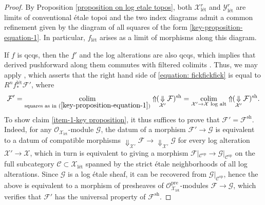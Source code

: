 \documentclass[11pt]{amsart}
\theoremstyle{definition}
\theoremstyle{definition}
\DeclareMathOperator{\arrowdown}{\!\Downarrow\!}
\newcommand{\cC}{\mathcal{C}}
\newcommand{\cF}{\mathcal{F}}
\newcommand{\cG}{\mathcal{G}}
\newcommand{\cX}{\mathcal{X}}
\newcommand{\cY}{\mathcal{Y}}
\newcommand{\LogO}[1]{\mathcal{O}_{{#1}_\text{l\'et}}}
\newcommand{\ul}[1]{\underline{#1}}
\newcommand{\cal}{\mathcal}
\def\cC{{\cal C}}
\def\cF{{\cal F}}
\def\cX{{\cal X}}
\def\cY{{\cal Y}}
\begin{document}
\begin{proof} 
By Proposition \ref{proposition on log etale topos}, both $\cX_{\text{l\'et}}^{r}$ and $\cY_{\text{l\'et}}^{r}$ are limits of conventional \'etale topoi and the two index diagrams admit a common refinement given by the diagram of all squares of the form \eqref{key-proposition-equation-1}. In particular, $f_{\text{l\'et}}$ arises as a limit of morphisms along this diagram. 

If $f$ is qcqs, then the $\ul{f}'$ and the log alterations are also qcqs, which implies that derived pushforward along them commutes with filtered colimits \cite[0GQW]{stacks}. Thus, we may apply \cite[Theorem VI.8.7.3]{SGA4}, which asserts that the right hand side of \eqref{equation: fickfickfick} is equal to $R^n f^{\text{l\'et}}_*\cF'$, where 
\begin{equation}\label{equation: first time sh is written differently}
\cF' = \underset{\text{squares as in (}\ref{key-proposition-equation-1}\text{)}}{\mathrm{colim}}\Uparrow\!\! (\arrowdown_{\cX'}\mathcal{F})^{\text{sh}} = \underset{\cX'\rightarrow \cX\text{ log alt}}{\mathrm{colim}}\Uparrow\!\! (\arrowdown_{\cX'}\mathcal{F})^{\text{sh}}.
\end{equation} 
To show claim \eqref{item-1-key proposition}, it thus suffices to prove that $\cF' = \cF^{\text{sh}}$. Indeed, for any $\LogO{\cX}$-module $\cG$, the datum of a morphism $\cF'\rightarrow \cG$ is equivalent to a datum of compatible morphisms $\Downarrow_{\cX'}\cF\rightarrow \Downarrow_{\cX'}\cG$ for every log alteration $\cX'\rightarrow\cX$, which in turn is equivalent to giving a morphism $\cF|_{\cC^{\text{op}}}\rightarrow\cG|_{\cC^{\text{op}}}$ on the full subcategory $\cC\subset \cX_{\text{l\'et}}$ spanned by the strict \'etale neighborhoods of all log alterations. Since $\cG$ is a log \'etale sheaf, it can be recovered from $\cG|_{\cC^{\text{op}}}$, hence the above is equivalent to a morphism of presheaves of $\LogO{\cX}^{\text{pre}}$-modules $\cF\rightarrow\cG$, which verifies that $\cF'$ has the universal property of $\cF^{\text{sh}}$.

\end{proof}
\end{document}
